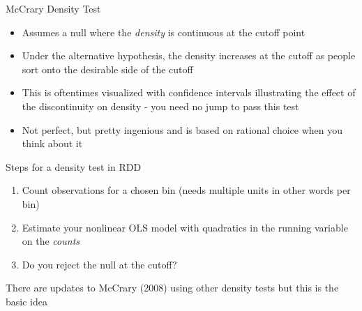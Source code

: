 \documentclass{beamer}
\begin{document}
\begin{frame}{McCrary Density Test}

	\begin{itemize}
	\item Assumes a null where the \emph{density} is continuous at the cutoff point 
	\item Under the alternative hypothesis, the density increases at the cutoff as people sort onto the desirable side of the cutoff
	\item This is oftentimes visualized with confidence intervals illustrating the effect of the discontinuity on density - you need no jump to pass this test
	\item Not perfect, but pretty ingenious and is based on rational choice when you think about it
	\end{itemize}

\end{frame}

\begin{frame}{Steps for a density test in RDD}

		\begin{enumerate}
		\item Count observations for a chosen bin (needs multiple units in other words per bin)
		\item Estimate your nonlinear OLS model with quadratics in the running variable on the \emph{counts}
		\item Do you reject the null at the cutoff?
		\end{enumerate}There are updates to McCrary (2008) using other density tests but this is the basic idea
\end{frame}
\end{document}
